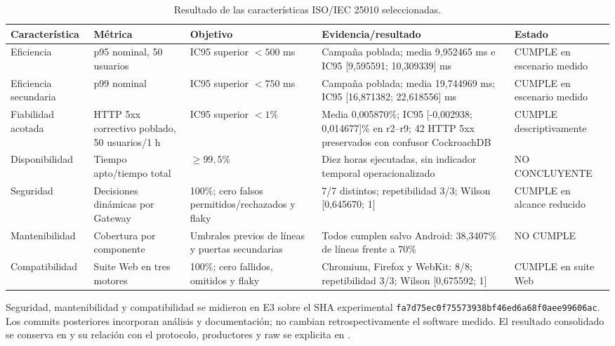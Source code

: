 \begin{table}[t]
  \centering
  \small
  \caption{Resultado de las características ISO/IEC 25010 seleccionadas.}
  \label{tab:resultado-iso25010}
  \begin{tabular}{|p{}|p{}|p{}|p{}|p{}|}
    \hline
    \textbf{Característica} & \textbf{Métrica} & \textbf{Objetivo} & \textbf{Evidencia/resultado} & \textbf{Estado} \\
    \hline
    Eficiencia & p95 nominal, 50 usuarios & IC95 superior $<500$ ms & Campaña poblada; media 9,952465 ms e IC95 [9,595591; 10,309339] ms & CUMPLE en escenario medido \\
    \hline
    Eficiencia secundaria & p99 nominal & IC95 superior $<750$ ms & Campaña poblada; media 19,744969 ms; IC95 [16,871382; 22,618556] ms & CUMPLE en escenario medido \\
    \hline
    Fiabilidad acotada & HTTP 5xx correctivo poblado, 50 usuarios/1 h & IC95 superior $<1\%$ & Media 0,005870\%; IC95 [-0,002938; 0,014677]\% en r2--r9; 42 HTTP 5xx preservados con confusor CockroachDB & CUMPLE descriptivamente \\
    \hline
    Disponibilidad & Tiempo apto/tiempo total & $\geq99,5\%$ & Diez horas ejecutadas, sin indicador temporal operacionalizado & NO CONCLUYENTE \\
    \hline
    Seguridad & Decisiones dinámicas por Gateway & 100\%; cero falsos permitidos/rechazados y flaky & 7/7 distintos; repetibilidad 3/3; Wilson [0,645670; 1] & CUMPLE en alcance reducido \\
    \hline
    Mantenibilidad & Cobertura por componente & Umbrales previos de líneas y puertas secundarias & Todos cumplen salvo Android: 38,3407\% de líneas frente a 70\% & NO CUMPLE \\
    \hline
    Compatibilidad & Suite Web en tres motores & 100\%; cero fallidos, omitidos y flaky & Chromium, Firefox y WebKit: 8/8; repetibilidad 3/3; Wilson [0,675592; 1] & CUMPLE en suite Web \\
    \hline
  \end{tabular}
\end{table}

Seguridad, mantenibilidad y compatibilidad se midieron en E3 sobre el SHA
experimental
\texttt{fa7d75ec0f75573938bf46ed6a68f0aee99606ac}. Los commits posteriores
incorporan análisis y documentación; no cambian retrospectivamente el software
medido. El resultado consolidado se conserva en
 y su relación con el
protocolo, productores y raw se explicita en
.


